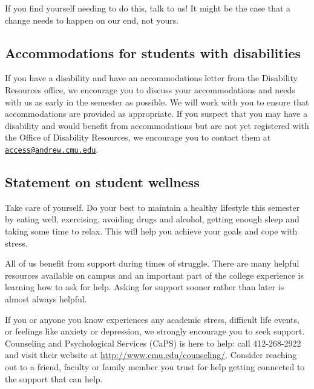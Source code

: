 \documentclass{article}
\begin{document}
If you find yourself needing to do this, talk to us! It might be the case that
a change needs to happen on our end, not yours.


\subsection*{Accommodations for students with disabilities}

If you have a disability and have an accommodations letter from the Disability
Resources office, we encourage you to discuss your accommodations and needs with
us as early in the semester as possible. We will work with you to ensure that
accommodations are provided as appropriate. If you suspect that you may have a
disability and would benefit from accommodations but are not yet registered with
the Office of Disability Resources, we encourage you to contact them at
\href{mailto:access@andrew.cmu.edu}{\texttt{access@andrew.cmu.edu}}.


\subsection*{Statement on student wellness}

Take care of yourself.  Do your best to maintain a healthy lifestyle this
semester by eating well, exercising, avoiding drugs and alcohol, getting enough
sleep and taking some time to relax. This will help you achieve your goals and
cope with stress.

All of us benefit from support during times of struggle. There are many helpful
resources available on campus and an important part of the college experience is
learning how to ask for help. Asking for support sooner rather than later is
almost always helpful.

If you or anyone you know experiences any academic stress, difficult life
events, or feelings like anxiety or depression, we strongly encourage you to
seek support. Counseling and Psychological Services (CaPS) is here to help: call
412-268-2922 and visit their website at \url{http://www.cmu.edu/counseling/}.
Consider reaching out to a friend, faculty or family member you trust for help
getting connected to the support that can help.

\end{document}
